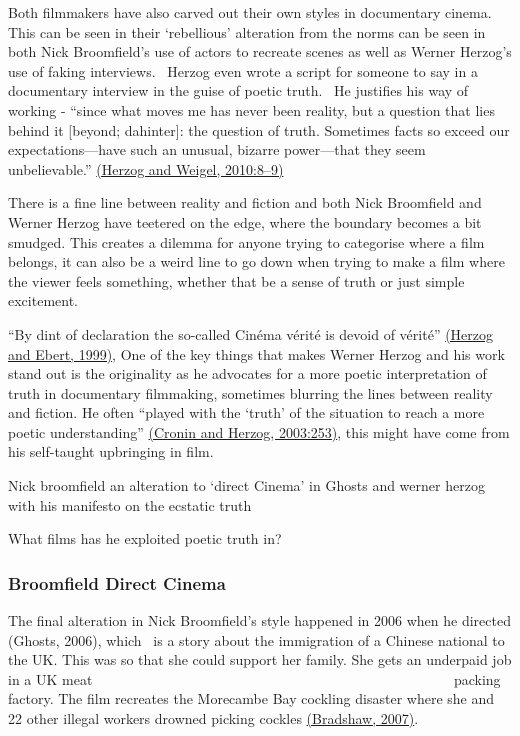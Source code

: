 \documentclass[
]{book}
\begin{document}
Both filmmakers have also carved out their own styles in documentary cinema. This can be seen in their `rebellious' alteration from the norms can be seen in both Nick Broomfield's use of actors to recreate scenes as well as Werner Herzog's use of faking interviews.~ Herzog even wrote a script for someone to say in a documentary interview in the guise of poetic truth.~ He justifies his way of working - ``since what moves me has never been reality, but a question that lies behind it {[}beyond; dahinter{]}: the question of truth. Sometimes facts so exceed our expectations---have such an unusual, bizarre power---that they seem unbelievable.'' \href{https://paperpile.com/c/SdLVV0/7OdH/?locator=8-9}{(Herzog and Weigel, 2010:8--9)}

There is a fine line between reality and fiction and both Nick Broomfield and Werner Herzog have teetered on the edge, where the boundary becomes a bit smudged. This creates a dilemma for anyone trying to categorise where a film belongs, it can also be a weird line to go down when trying to make a film where the viewer feels something, whether that be a sense of truth or just simple excitement.~

``By dint of declaration the so-called Cinéma vérité is devoid of vérité'' \href{https://paperpile.com/c/SdLVV0/qSB4}{(Herzog and Ebert, 1999)}, One of the key things that makes Werner Herzog and his work stand out is the originality as he advocates for a more poetic interpretation of truth in documentary filmmaking, sometimes blurring the lines between reality and fiction. He often ``played with the `truth' of the situation to reach a more poetic understanding'' \href{https://paperpile.com/c/SdLVV0/n5mQ/?locator=253}{(Cronin and Herzog, 2003:253)}, this might have come from his self-taught upbringing in film.~

Nick broomfield an alteration to `direct Cinema' in Ghosts and werner herzog with his manifesto on the ecstatic truth~

What films has he exploited poetic truth in?

\hypertarget{broomfield-direct-cinema}{%
\subsubsection{Broomfield Direct Cinema}\label{broomfield-direct-cinema}}

The final alteration in Nick Broomfield's style happened in 2006 when he directed (Ghosts, 2006), which~ is a story about the immigration of a Chinese national to the UK. This was so that she could support her family. She gets an underpaid job in a UK meat~ ~ ~ ~ ~ ~ ~ ~ ~ ~ ~ ~ ~ ~ ~ ~ ~ ~ ~ ~ ~ ~ ~ ~ ~ ~ ~ ~ ~ ~ ~ packing factory. The film recreates the Morecambe Bay cockling disaster where she and 22 other illegal workers drowned picking cockles \href{https://paperpile.com/c/SdLVV0/1IqG}{(Bradshaw, 2007)}.
\end{document}
